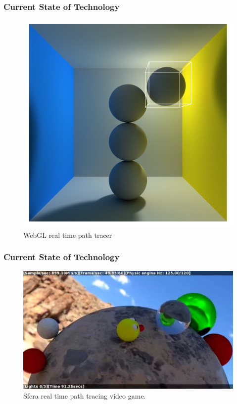 \documentclass{beamer}
\begin{document}
\begin{frame}
    \frametitle{Current State of Technology}
    \begin{figure}[H]
        \includegraphics[scale=0.3]{webgl-pathtracer}
        \centering
        \caption{WebGL real time path tracer}
    \end{figure}
\end{frame}

\begin{frame}
    \frametitle{Current State of Technology}
    \begin{figure}[H]
        \includegraphics[scale=0.2]{sfera}
        \centering
        \caption{Sfera real time path tracing video game.}
    \end{figure}
\end{frame}
\end{document}

